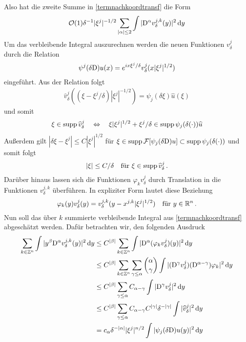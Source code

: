 Also hat die zweite Summe in \eqref{termnachkoordtransf} die Form
\begin{align}\label{restnachkoord}
\mathcal O(1) \delta^{-1}|\xi^j|^{-1/2}\sum_{\lvert\alpha\rvert\le 2}\int  |\mathrm D^\alpha v^{j,k}_\delta(y)|^2\,\mathrm d y
\end{align}
Um das verbleibende Integral auszurechnen werden die neuen Funktionen $v^j_\delta$ durch die Relation
\begin{align*}
\psi^j(\delta\mathrm D)u(x) = e^{ix\xi^j/\delta}v^j_\delta(x|\xi^j|^{1/2})
\end{align*}
eingeführt. Aus der Relation folgt
\begin{align*}
\widehat v^j_\delta ((\xi-\xi^j/\delta)|\xi^j|^{-1/2}) = \psi_j(\delta\xi)\widehat u(\xi)
\end{align*}
und somit
\begin{align*}
\xi \in\operatorname{supp}\widehat v^j_\delta \quad\Leftrightarrow\quad \xi|\xi^j|^{1/2} + \xi^j/\delta\in\operatorname{supp} \psi_j(\delta(\cdot))\widehat u
\end{align*}
Außerdem gilt $|\delta\xi-\xi^j|\le C|\xi^j|^{1/2}$ für $\xi\in\operatorname{supp} \mathcal F[\psi_j(\delta\mathrm D)u]\subset\operatorname{supp} \psi_j(\delta (\cdot))$ und somit folgt
\begin{align*}
|\xi|\le C/\delta \quad \text{für } \xi \in\operatorname{supp}\widehat v^j_\delta\,.
\end{align*}
Darüber hinaus lassen sich die Funktionen $\varphi_k v^j_\delta$ durch Translation in die Funktionen $v^{j,k}_\delta$ überführen. In expliziter Form lautet diese Beziehung
\begin{align*}
\varphi_k(y) v^j_\delta (y) = v^{j,k}_\delta (y-x^{j,k}|\xi^j|^{1/2})\quad\text{für }y\in\mathbb R^n\,.
\end{align*}
Nun soll das über $k$ summierte verbleibende Integral aus \eqref{termnachkoordtransf} abgeschätzt werden. Dafür betrachten wir, den folgenden Ausdruck
\begin{align}
\sum_{k\in\mathbb Z^n} \int|y^\beta\mathrm D^\alpha v^{j,k}_\delta(y)|^2\,\mathrm d y &\le C^{\lvert\beta\rvert} \sum_{k\in\mathbb Z^n} \int |\mathrm D^\alpha(\varphi_k v^j_\delta)(y)|^2\,\mathrm d y \nonumber\\
&\le C^{\lvert\beta\rvert} \sum_{k\in\mathbb Z^n}\sum_{\gamma\le\alpha}\binom{\alpha}{\gamma}\int |(\mathrm D^\gamma v^j_\delta)(\mathrm D^{\alpha-\gamma})\varphi_k|^2\,\mathrm d y\nonumber\\
&\le C^{\lvert\beta\rvert}\sum_{\gamma\le\alpha}C_{\alpha-\gamma}\int |\mathrm D^\gamma v^j_\delta|^2\,\mathrm d y\nonumber\\
&\le C^{\lvert\beta\rvert}\sum_{\gamma\le\alpha}C_{\alpha-\gamma}C^{\lvert\gamma\rvert}\delta^{-\lvert\gamma\rvert}\int |\widehat v^j_\delta|^2\,\mathrm d y\nonumber\\
&= c_\alpha \delta^{-\lvert\alpha\rvert}|\xi^j|^{n/2}\int |\psi_j(\delta\mathrm D)u(y)|^2\,\mathrm d y\label{polynomnachoben}
\end{align}
